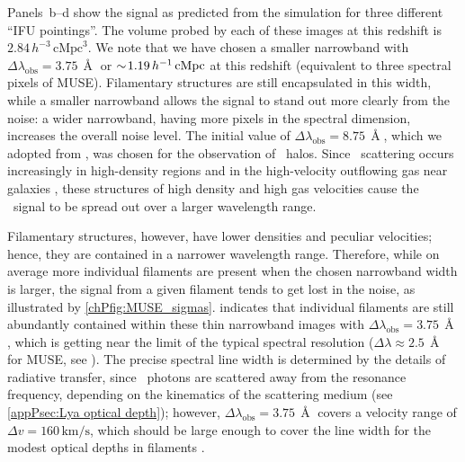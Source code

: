 Panels~b--d show the signal as predicted from the simulation for three different ``IFU pointings''. The volume probed by each of these images at this redshift is $2.84 \, h^{-3} \, \mathrm{cMpc}^3$. We note that we have chosen a smaller narrowband with $\Delta \lambda_\text{obs} = 3.75 \, \Angstrom$ or $\sim \! 1.19 \, h^{-1} \, \mathrm{cMpc}$ at this redshift (equivalent to three spectral pixels of MUSE). Filamentary structures are still encapsulated in this width, while a smaller narrowband allows the signal to stand out more clearly from the noise: a wider narrowband, having more pixels in the spectral dimension, increases the overall noise level. The initial value of $\Delta \lambda_\text{obs} = 8.75 \, \Angstrom$, which we adopted from \citet{2016A&A...587A..98W}, was chosen for the observation of \lya\ halos. Since \lya\ scattering occurs increasingly in high-density regions and in the high-velocity outflowing gas near galaxies \citep[e.g.][]{2006A&A...460..397V}, these structures of high density and high gas velocities cause the \lya\ signal to be spread out over a larger wavelength range.

Filamentary structures, however, have lower densities and peculiar velocities; hence, they are contained in a narrower wavelength range. Therefore, while on average more individual filaments are present when the chosen narrowband width is larger, the signal from a given filament tends to get lost in the noise, as illustrated by \cref{chPfig:MUSE_sigmas}.  indicates that individual filaments are still abundantly contained within these thin narrowband images with $\Delta \lambda_\text{obs} = 3.75 \, \Angstrom$, which is getting near the limit of the typical spectral resolution ($\Delta \lambda \approx 2.5 \, \Angstrom$ for MUSE, see \citealt{2010SPIE.7735E..08B}). The precise spectral line width is determined by the details of radiative transfer, since \lya\ photons are scattered away from the resonance frequency, depending on the kinematics of the scattering medium (see \cref{appPsec:Lya optical depth}); however, $\Delta \lambda_\text{obs} = 3.75 \, \Angstrom$ covers a velocity range of $\Delta v = 160 \, \mathrm{km/s}$, which should be large enough to cover the line width for the modest optical depths in filaments \citep[e.g. equation (21) in][]{2014PASA...31...40D}.

